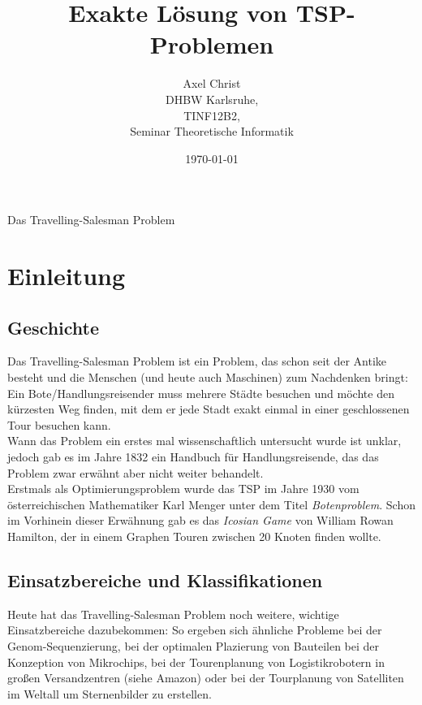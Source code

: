 \documentclass[a4paper, 11pt]{article}
\begin{document}
\title{Exakte Lösung von TSP-Problemen}
\author{Axel Christ\\
  DHBW Karlsruhe,\\
  TINF12B2,\\
  Seminar Theoretische Informatik}
\date{\today}
\maketitle
\newpage

\tableofcontents
\newpage

Das Travelling-Salesman Problem

\section{Einleitung}

\subsection{Geschichte}

Das Travelling-Salesman Problem ist ein Problem, das schon seit der Antike
besteht und die Menschen (und heute auch Maschinen) zum Nachdenken bringt:
Ein Bote/Handlungsreisender muss mehrere Städte besuchen und möchte den
kürzesten Weg finden, mit dem er jede Stadt exakt einmal in einer geschlossenen
Tour besuchen kann. \\

Wann das Problem ein erstes mal wissenschaftlich untersucht wurde ist unklar,
jedoch gab es im Jahre 1832 ein Handbuch für Handlungsreisende, das das Problem
zwar erwähnt aber nicht weiter behandelt.\\

Erstmals als Optimierungsproblem wurde das TSP im Jahre 1930 vom österreichischen
Mathematiker Karl Menger unter dem Titel \textit{Botenproblem}. Schon im
Vorhinein dieser Erwähnung gab es das \textit{Icosian Game} von William Rowan
Hamilton, der in einem Graphen Touren zwischen 20 Knoten finden wollte.\\

\subsection{Einsatzbereiche und Klassifikationen}

Heute hat das Travelling-Salesman Problem noch weitere, wichtige Einsatzbereiche
dazubekommen: So ergeben sich ähnliche Probleme bei der Genom-Sequenzierung, bei
der optimalen Plazierung von Bauteilen bei der Konzeption von Mikrochips, bei
der Tourenplanung von Logistikrobotern in großen Versandzentren (siehe Amazon)
oder bei der Tourplanung von Satelliten im Weltall um Sternenbilder zu erstellen.\\
\end{document}
